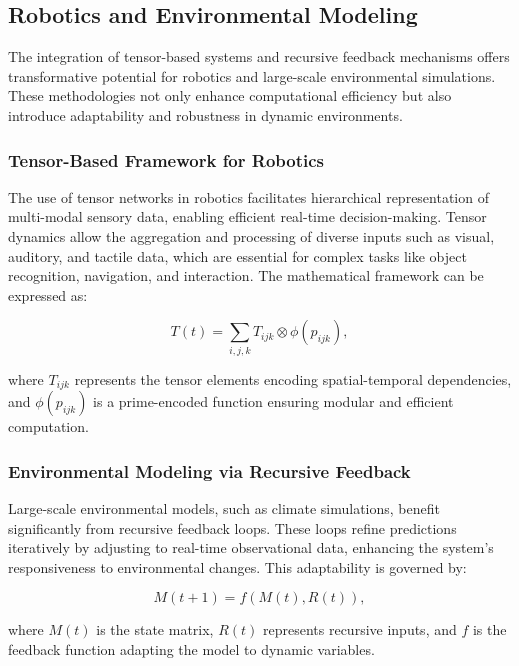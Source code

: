 \documentclass{article}
\theoremstyle{plain}
\begin{document}
\subsection{Robotics and Environmental Modeling}

The integration of tensor-based systems and recursive feedback mechanisms offers transformative potential for robotics and large-scale environmental simulations. These methodologies not only enhance computational efficiency but also introduce adaptability and robustness in dynamic environments. 

\subsubsection{Tensor-Based Framework for Robotics}

The use of tensor networks in robotics facilitates hierarchical representation of multi-modal sensory data, enabling efficient real-time decision-making. Tensor dynamics allow the aggregation and processing of diverse inputs such as visual, auditory, and tactile data, which are essential for complex tasks like object recognition, navigation, and interaction. The mathematical framework can be expressed as:

\begin{equation}
T(t) = \sum_{i,j,k} T_{ijk} \otimes \phi(p_{ijk}),
\end{equation}

where $T_{ijk}$ represents the tensor elements encoding spatial-temporal dependencies, and $\phi(p_{ijk})$ is a prime-encoded function ensuring modular and efficient computation.

\subsubsection{Environmental Modeling via Recursive Feedback}

Large-scale environmental models, such as climate simulations, benefit significantly from recursive feedback loops. These loops refine predictions iteratively by adjusting to real-time observational data, enhancing the system's responsiveness to environmental changes. This adaptability is governed by:

\begin{equation}
M(t+1) = f(M(t), R(t)),
\end{equation}

where $M(t)$ is the state matrix, $R(t)$ represents recursive inputs, and $f$ is the feedback function adapting the model to dynamic variables.
\end{document}
